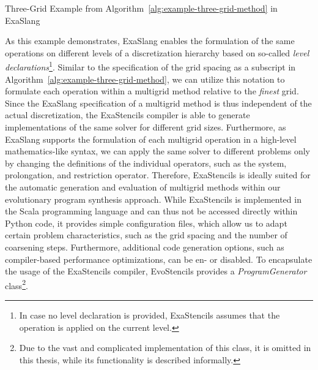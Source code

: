 \begin{listing}
	\inputminted[fontsize=\footnotesize,breaklines]{scala}{evostencils/code_generation/three_grid_example.exa3}
	\caption{Three-Grid Example from Algorithm~\ref{alg:example-three-grid-method} in ExaSlang}
	\label{code:exaslang-example}
\end{listing}
As this example demonstrates, ExaSlang enables the formulation of the same operations on different levels of a discretization hierarchy based on so-called \emph{level declarations}\footnote{In case no level declaration is provided, ExaStencils assumes that the operation is applied on the current level.}.
Similar to the specification of the grid spacing as a subscript in Algorithm~\ref{alg:example-three-grid-method}, we can utilize this notation to formulate each operation within a multigrid method relative to the \emph{finest} grid.
Since the ExaSlang specification of a multigrid method is thus independent of the actual discretization, the ExaStencils compiler is able to generate implementations of the same solver for different grid sizes.
Furthermore, as ExaSlang supports the formulation of each multigrid operation in a high-level mathematics-like syntax, we can apply the same solver to different problems only by changing the definitions of the individual operators, such as the system, prolongation, and restriction operator.
Therefore, ExaStencils is ideally suited for the automatic generation and evaluation of multigrid methods within our evolutionary program synthesis approach.
While ExaStencils is implemented in the Scala programming language and can thus not be accessed directly within Python code, it provides simple configuration files, which allow us to adapt certain problem characteristics, such as the grid spacing and the number of coarsening steps.
Furthermore, additional code generation options, such as compiler-based performance optimizations, can be en- or disabled.
To encapsulate the usage of the ExaStencils compiler, EvoStencils provides a \emph{ProgramGenerator} class\footnote{Due to the vast and complicated implementation of this class, it is omitted in this thesis, while its functionality is described informally.}.
